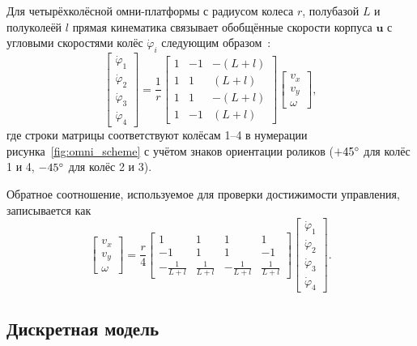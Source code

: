 Для четырёхколёсной омни-платформы с радиусом колеса $r$, полубазой $L$
и полуколеёй $l$ прямая кинематика связывает обобщённые скорости
корпуса $\mathbf{u}$ с угловыми скоростями колёс $\dot{\varphi}_i$
следующим образом~\cite{MorenoCaireta2020MPC}:
\begin{equation}
\begin{bmatrix}
\dot{\varphi}_1\\[2pt]
\dot{\varphi}_2\\[2pt]
\dot{\varphi}_3\\[2pt]
\dot{\varphi}_4
\end{bmatrix}
=
\frac{1}{r}
\begin{bmatrix}
1 & -1 & -(L+l)\\
1 &  1 &  (L+l)\\
1 &  1 & -(L+l)\\
1 & -1 &  (L+l)
\end{bmatrix}
\begin{bmatrix}
v_x\\ v_y\\ \omega
\end{bmatrix},
\label{eq:jacobian}
\end{equation}
где строки матрицы соответствуют колёсам 1--4 в нумерации
рисунка~\ref{fig:omni_scheme} с учётом знаков ориентации роликов
($+45\degree{}$ для колёс 1 и 4, $-45\degree{}$ для колёс 2 и 3).

Обратное соотношение, используемое для проверки достижимости
управления, записывается как
\begin{equation}
\begin{bmatrix} v_x\\ v_y\\ \omega \end{bmatrix}
= \frac{r}{4}
\begin{bmatrix}
1 & 1 & 1 & 1\\
-1 & 1 & 1 & -1\\
-\frac{1}{L+l} & \frac{1}{L+l} & -\frac{1}{L+l} & \frac{1}{L+l}
\end{bmatrix}
\begin{bmatrix}
\dot{\varphi}_1\\ \dot{\varphi}_2\\ \dot{\varphi}_3\\ \dot{\varphi}_4
\end{bmatrix}.
\label{eq:inverse_jacobian}
\end{equation}

\subsection{Дискретная модель}

